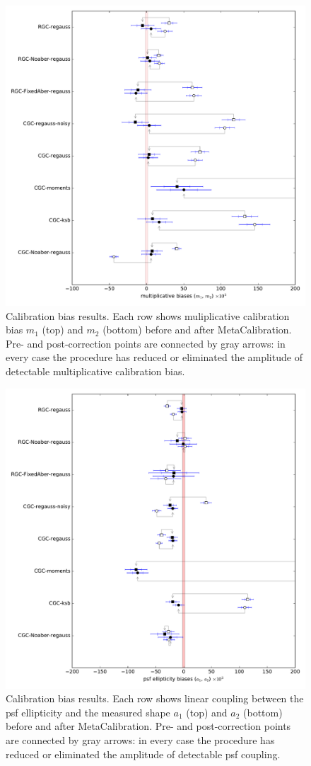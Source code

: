 \documentclass[iop]{emulateapj}
\begin{document}
\begin{figure}[t]
\begin{center}
\includegraphics[width=0.8\linewidth]{./Plots/m_results_linear.pdf}
\end{center}
\caption{Calibration bias results. Each row shows muliplicative
  calibration bias $m_1$ (top) and $m_2$ (bottom) before and after
  MetaCalibration. Pre- and post-correction points are connected by
  gray arrows: in every case the procedure has reduced or eliminated
  the amplitude of detectable multiplicative calibration bias.}
\end{figure}

\begin{figure}[t]
\begin{center}
\includegraphics[width=0.8\linewidth]{./Plots/a_results_linear.pdf}
\end{center}
\caption{Calibration bias results. Each row shows linear coupling
  between the psf ellipticity and the measured shape $a_1$ (top) and
  $a_2$ (bottom) before and after MetaCalibration. Pre- and
  post-correction points are connected by gray arrows: in every case
  the procedure has reduced or eliminated the amplitude of detectable
  psf coupling.}
\end{figure}
\end{document}
